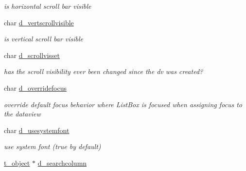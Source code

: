 \begin{DoxyCompactItemize}
\begin{DoxyCompactList}\small\item\em is horizontal scroll bar visible \item\end{DoxyCompactList}\item 
\hypertarget{structt__jdataview_ac76126b5b6b6107ed9e3e60364ababc8}{
char \hyperlink{structt__jdataview_ac76126b5b6b6107ed9e3e60364ababc8}{d\_\-vertscrollvisible}}
\label{structt__jdataview_ac76126b5b6b6107ed9e3e60364ababc8}

\begin{DoxyCompactList}\small\item\em is vertical scroll bar visible \item\end{DoxyCompactList}\item 
\hypertarget{structt__jdataview_ad8c5c9dac492ecd0e0ab7ac9927a59bf}{
char \hyperlink{structt__jdataview_ad8c5c9dac492ecd0e0ab7ac9927a59bf}{d\_\-scrollvisset}}
\label{structt__jdataview_ad8c5c9dac492ecd0e0ab7ac9927a59bf}

\begin{DoxyCompactList}\small\item\em has the scroll visibility ever been changed since the dv was created? \item\end{DoxyCompactList}\item 
\hypertarget{structt__jdataview_a09105f94bf0940a163de70dc533b5574}{
char \hyperlink{structt__jdataview_a09105f94bf0940a163de70dc533b5574}{d\_\-overridefocus}}
\label{structt__jdataview_a09105f94bf0940a163de70dc533b5574}

\begin{DoxyCompactList}\small\item\em override default focus behavior where ListBox is focused when assigning focus to the dataview \item\end{DoxyCompactList}\item 
\hypertarget{structt__jdataview_ab2420d712c7471cb44ea215e0f8fcbe7}{
char \hyperlink{structt__jdataview_ab2420d712c7471cb44ea215e0f8fcbe7}{d\_\-usesystemfont}}
\label{structt__jdataview_ab2420d712c7471cb44ea215e0f8fcbe7}

\begin{DoxyCompactList}\small\item\em use system font (true by default) \item\end{DoxyCompactList}\item 
\hypertarget{structt__jdataview_af8408e92793ee283c269972430fc9ec2}{
\hyperlink{structt__object}{t\_\-object} $\ast$ \hyperlink{structt__jdataview_af8408e92793ee283c269972430fc9ec2}{d\_\-searchcolumn}}
\label{structt__jdataview_af8408e92793ee283c269972430fc9ec2}


\end{DoxyCompactItemize}
